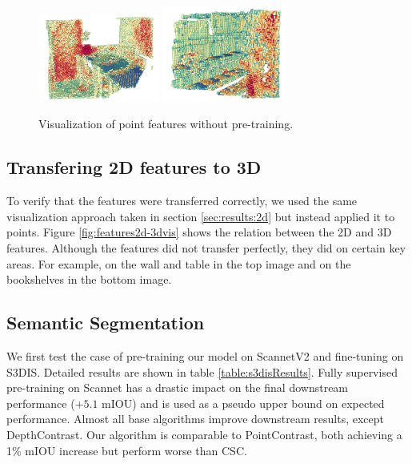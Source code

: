 \documentclass[10pt,twocolumn,letterpaper]{article}
\begin{document}
\begin{figure}
    \centering
    \includegraphics[width=4cm]{images/experiments/scratch-3d.png}
    \includegraphics[width=4cm]{images/experiments/scratch-3d-2.png}
    \caption{Visualization of point features without pre-training.}
    \label{fig:features2dScratchvis}
\end{figure}

\subsection{Transfering 2D features to 3D}
\label{sec:results:2d3d}

To verify that the features were transferred correctly, we used the same visualization approach taken in section \ref{sec:results:2d} but instead applied it to points. Figure \ref{fig:features2d-3dvis} shows the relation between the 2D and 3D features. Although the features did not transfer perfectly, they did on certain key areas. For example, on the wall and table in the top image and on the bookshelves in the bottom image.

\subsection{Semantic Segmentation}
\label{sec:results:semantic}

We first test the case of pre-training our model on ScannetV2 and fine-tuning on S3DIS. Detailed results are shown in table \ref{table:s3disResults}. Fully supervised pre-training on Scannet has a drastic impact on the final downstream performance ($+5.1$ mIOU) and is used as a pseudo upper bound on expected performance. Almost all base algorithms improve downstream results, except DepthContrast. Our algorithm is comparable to PointContrast, both achieving a 1\% mIOU increase but perform worse than CSC.
\end{document}
